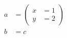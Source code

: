 \begin{align}
a & = \left( \begin{aligned} x & = 1 \\ y & = 2 \end{aligned} \right) \\
b & = c
\end{align}
